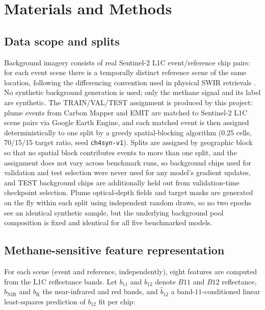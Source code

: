 \documentclass[10pt,twocolumn]{article}
\begin{document}
\section{Materials and Methods}
\label{sec:methods}

\subsection{Data scope and splits}

Background imagery consists of real Sentinel-2 L1C event/reference chip pairs: for each event scene there is a temporally distinct reference scene of the same location, following the differencing convention used in physical SWIR retrievals \citep{varon2021highfrequency,gorrono2023understanding}. No synthetic background generation is used; only the methane signal and its label are synthetic. The TRAIN/VAL/TEST assignment is produced by this project: plume events from Carbon Mapper and EMIT are matched to Sentinel-2 L1C scene pairs via Google Earth Engine, and each matched event is then assigned deterministically to one split by a greedy spatial-blocking algorithm (0.25\textdegree{} cells, 70/15/15 target ratio, seed \texttt{ch4syn-v1}). Splits are assigned by geographic block so that no spatial block contributes events to more than one split, and the assignment does not vary across benchmark runs, so background chips used for validation and test selection were never used for any model's gradient updates, and TEST background chips are additionally held out from validation-time checkpoint selection. Plume optical-depth fields and target masks are generated on the fly within each split using independent random draws, so no two epochs see an identical synthetic sample, but the underlying background pool composition is fixed and identical for all five benchmarked models.

\subsection{Methane-sensitive feature representation}
\label{sec:features}

For each scene (event and reference, independently), eight features are computed from the L1C reflectance bands. Let $b_{11}$ and $b_{12}$ denote $B11$ and $B12$ reflectance, $b_{\mathrm{NIR}}$ and $b_{\mathrm{R}}$ the near-infrared and red bands, and $\hat b_{12}$ a band-$11$-conditioned linear least-squares prediction of $b_{12}$ fit per chip:
\end{document}
